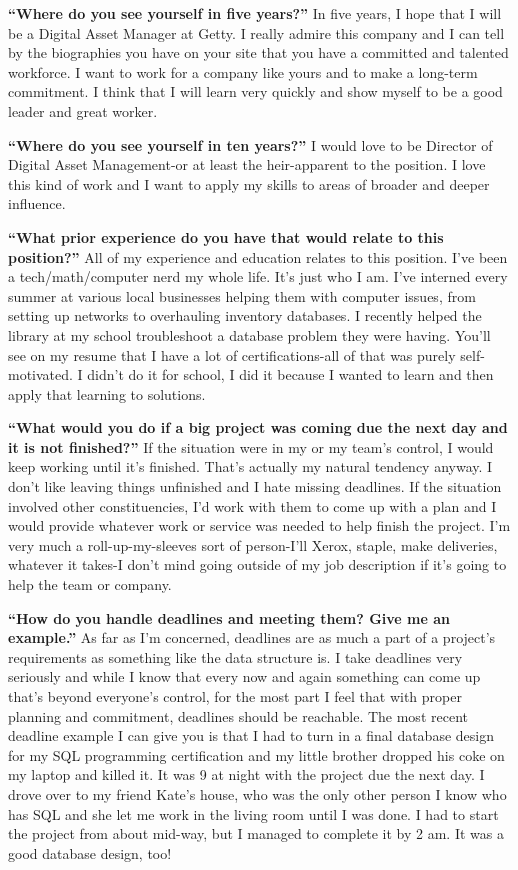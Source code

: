 \textbf{``Where do you see yourself in five years?''}
 \break In five years, I hope that I will be a Digital Asset Manager at Getty. I really admire this company and I can tell by the biographies you have on your site that you have a committed and talented workforce. I want to work for a company like yours and to make a long-term commitment. I think that I will learn very quickly and show myself to be a good leader and great worker.

\textbf{``Where do you see yourself in ten years?''}
\break I would love to be Director of Digital Asset Management-or at least the heir-apparent to the position. I love this kind of work and I want to apply my skills to areas of broader and deeper influence.

\textbf{``What prior experience do you have that would relate to this position?''}
\break All of my experience and education relates to this position. I've been a tech/math/computer nerd my whole life. It's just who I am. I've interned every summer at various local businesses helping them with computer issues, from setting up networks to overhauling inventory databases. I recently helped the library at my school troubleshoot a database problem they were having. You'll see on my resume that I have a lot of certifications-all of that was purely self-motivated. I didn't do it for school, I did it because I wanted to learn and then apply that learning to solutions.

\textbf{``What would you do if a big project was coming due the next day and it is not finished?''}
\break If the situation were in my or my team's control, I would keep working until it's finished. That's actually my natural tendency anyway. I don't like leaving things unfinished and I hate missing deadlines. If the situation involved other constituencies, I'd work with them to come up with a plan and I would provide whatever work or service was needed to help finish the project. I'm very much a roll-up-my-sleeves sort of person-I'll Xerox, staple, make deliveries, whatever it takes-I don't mind going outside of my job description if it's going to help the team or company.

\textbf{``How do you handle deadlines and meeting them? Give me an example.''}
\break As far as I'm concerned, deadlines are as much a part of a project's requirements as something like the data structure is. I take deadlines very seriously and while I know that every now and again something can come up that's beyond everyone's control, for the most part I feel that with proper planning and commitment, deadlines should be reachable. The most recent deadline example I can give you is that I had to turn in a final database design for my SQL programming certification and my little brother dropped his coke on my laptop and killed it. It was 9 at night with the project due the next day. I drove over to my friend Kate's house, who was the only other person I know who has SQL and she let me work in the living room until I was done. I had to start the project from about mid-way, but I managed to complete it by 2 am. It was a good database design, too!

